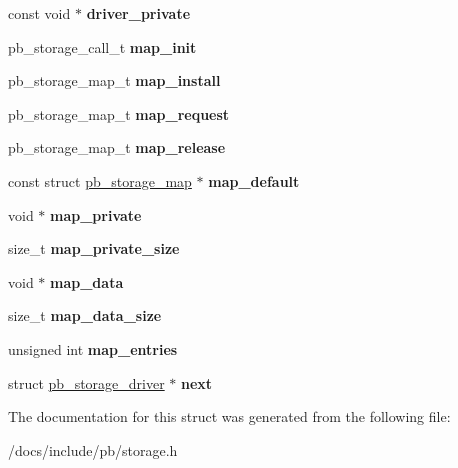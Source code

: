 \begin{DoxyCompactItemize}
const void $\ast$ {\bfseries driver\+\_\+private}
\item 
\mbox{\label{structpb__storage__driver_a6b1f32d7a894c2da878d782dfabc6b85}} 
pb\+\_\+storage\+\_\+call\+\_\+t {\bfseries map\+\_\+init}
\item 
\mbox{\label{structpb__storage__driver_ae0ee938c289aaf3a17e1c33801c589d1}} 
pb\+\_\+storage\+\_\+map\+\_\+t {\bfseries map\+\_\+install}
\item 
\mbox{\label{structpb__storage__driver_a48c5c1345e24ce89c24e51a1f1c39d42}} 
pb\+\_\+storage\+\_\+map\+\_\+t {\bfseries map\+\_\+request}
\item 
\mbox{\label{structpb__storage__driver_a3b9ab25c8b5051686556a6d44520beaa}} 
pb\+\_\+storage\+\_\+map\+\_\+t {\bfseries map\+\_\+release}
\item 
\mbox{\label{structpb__storage__driver_ac151fbc69970f5d90adb2477b293fe57}} 
const struct \hyperlink{structpb__storage__map}{pb\+\_\+storage\+\_\+map} $\ast$ {\bfseries map\+\_\+default}
\item 
\mbox{\label{structpb__storage__driver_ac57e3f5c64d9f061c1356c4bf8c36e2a}} 
void $\ast$ {\bfseries map\+\_\+private}
\item 
\mbox{\label{structpb__storage__driver_afe9a9a53fc6672ec75020b145abe45dc}} 
size\+\_\+t {\bfseries map\+\_\+private\+\_\+size}
\item 
\mbox{\label{structpb__storage__driver_aced8d5100eb9d79d98680c6f1cc957a4}} 
void $\ast$ {\bfseries map\+\_\+data}
\item 
\mbox{\label{structpb__storage__driver_ae41d391e46bc5b03eade9ee15a46c676}} 
size\+\_\+t {\bfseries map\+\_\+data\+\_\+size}
\item 
\mbox{\label{structpb__storage__driver_af9dad94e782aef715efba8d6128c79d6}} 
unsigned int {\bfseries map\+\_\+entries}
\item 
\mbox{\label{structpb__storage__driver_a9d56a1f4fbb0786f070a00864f886667}} 
struct \hyperlink{structpb__storage__driver}{pb\+\_\+storage\+\_\+driver} $\ast$ {\bfseries next}
\end{DoxyCompactItemize}


The documentation for this struct was generated from the following file\+:\begin{DoxyCompactItemize}
\item 
/docs/include/pb/storage.\+h\end{DoxyCompactItemize}
